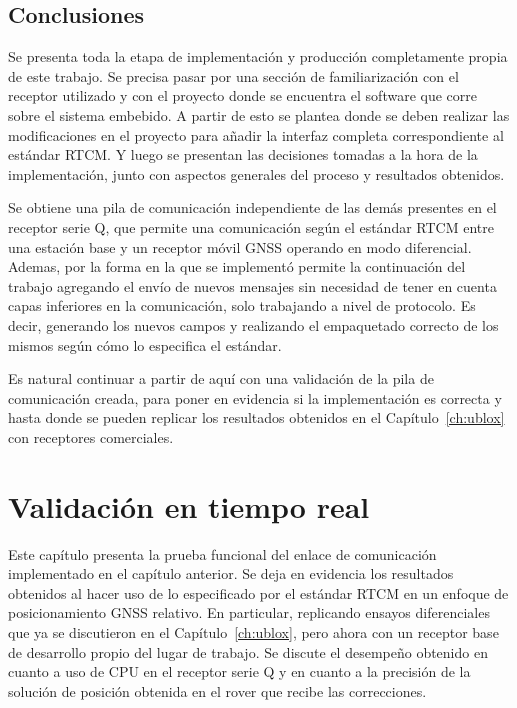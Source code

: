 \documentclass[a4paper,12pt,oneside,onecolumn,final,openright]{book}%
\begin{document}
\section{Conclusiones}
	Se presenta toda la etapa de implementación y producción completamente propia de este trabajo. Se precisa pasar por una sección de familiarización con el receptor utilizado y con el proyecto donde se encuentra el software que corre sobre el sistema embebido. A partir de esto se plantea donde se deben realizar las modificaciones en el proyecto para añadir la interfaz completa correspondiente al estándar RTCM. Y luego se presentan las decisiones tomadas a la hora de la implementación, junto con aspectos generales del proceso y resultados obtenidos. 
	
	Se obtiene una pila de comunicación independiente de las demás presentes en el receptor serie Q, que permite una comunicación según el estándar RTCM entre una estación base y un receptor móvil GNSS operando en modo diferencial. Ademas, por la forma en la que se implementó permite la continuación del trabajo agregando el envío de nuevos mensajes sin necesidad de tener en cuenta capas inferiores en la comunicación, solo trabajando a nivel de protocolo. Es decir, generando los nuevos campos y realizando el empaquetado correcto de los mismos según cómo lo especifica el estándar.
	
	Es natural continuar a partir de aquí con una validación de la pila de comunicación creada, para poner en evidencia si la implementación es correcta y hasta donde se pueden replicar los resultados obtenidos en el Capítulo~\ref{ch:ublox} con receptores comerciales.
\chapter{Validación en tiempo real}\label{ch:validacion}
	Este capítulo presenta la prueba funcional del enlace de comunicación implementado en el capítulo anterior. Se deja en evidencia los resultados obtenidos al hacer uso de lo especificado por el estándar RTCM en un enfoque de posicionamiento GNSS relativo. En particular, replicando ensayos diferenciales que ya se discutieron en el Capítulo~\ref{ch:ublox}, pero ahora con un receptor base de desarrollo propio del lugar de trabajo. Se discute el desempeño obtenido en cuanto a uso de CPU en el receptor serie Q y en cuanto a la precisión de la solución de posición obtenida en el rover que recibe las correcciones.
\end{document}
